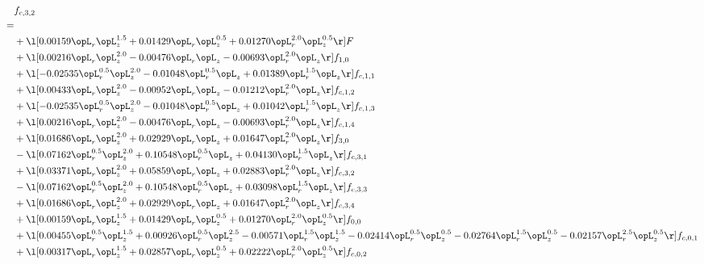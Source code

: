 \begin{alignat}{2} 
\label{eq:f_32_1} 
& f_{c,3,2} \nonumber \\ 
 = \\ 
& + \l[  0.00159 \opL_r \opL_z^{1.5} +  0.01429 \opL_r \opL_z^{0.5} +  0.01270 \opL_r^{2.0} \opL_z^{0.5}  \r] F \nonumber \\ 
& + \l[  0.00216 \opL_r \opL_z^{2.0}   -0.00476 \opL_r \opL_z   -0.00693 \opL_r^{2.0} \opL_z  \r] f_{1,0} \nonumber \\ 
& + \l[  -0.02535 \opL_r^{0.5} \opL_z^{2.0}   -0.01048 \opL_r^{0.5} \opL_z +  0.01389 \opL_r^{1.5} \opL_z  \r] f_{c,1,1} \nonumber \\ 
& + \l[  0.00433 \opL_r \opL_z^{2.0}   -0.00952 \opL_r \opL_z   -0.01212 \opL_r^{2.0} \opL_z  \r] f_{c,1,2} \nonumber \\ 
& + \l[  -0.02535 \opL_r^{0.5} \opL_z^{2.0}   -0.01048 \opL_r^{0.5} \opL_z +  0.01042 \opL_r^{1.5} \opL_z  \r] f_{c,1,3} \nonumber \\ 
& + \l[  0.00216 \opL_r \opL_z^{2.0}   -0.00476 \opL_r \opL_z   -0.00693 \opL_r^{2.0} \opL_z  \r] f_{c,1,4} \nonumber \\ 
& + \l[  0.01686 \opL_r \opL_z^{2.0} +  0.02929 \opL_r \opL_z +  0.01647 \opL_r^{2.0} \opL_z  \r] f_{3,0} \nonumber \\ 
& - \l[  0.07162 \opL_r^{0.5} \opL_z^{2.0} +  0.10548 \opL_r^{0.5} \opL_z +  0.04130 \opL_r^{1.5} \opL_z  \r] f_{c,3,1} \nonumber \\ 
& + \l[  0.03371 \opL_r \opL_z^{2.0} +  0.05859 \opL_r \opL_z +  0.02883 \opL_r^{2.0} \opL_z  \r] f_{c,3,2} \nonumber \\ 
& - \l[  0.07162 \opL_r^{0.5} \opL_z^{2.0} +  0.10548 \opL_r^{0.5} \opL_z +  0.03098 \opL_r^{1.5} \opL_z  \r] f_{c,3,3} \nonumber \\ 
& + \l[  0.01686 \opL_r \opL_z^{2.0} +  0.02929 \opL_r \opL_z +  0.01647 \opL_r^{2.0} \opL_z  \r] f_{c,3,4} \nonumber \\ 
& + \l[  0.00159 \opL_r \opL_z^{1.5} +  0.01429 \opL_r \opL_z^{0.5} +  0.01270 \opL_r^{2.0} \opL_z^{0.5}  \r] f_{0,0} \nonumber \\ 
& + \l[  0.00455 \opL_r^{0.5} \opL_z^{1.5} +  0.00926 \opL_r^{0.5} \opL_z^{2.5}   -0.00571 \opL_r^{1.5} \opL_z^{1.5}   -0.02414 \opL_r^{0.5} \opL_z^{0.5}   -0.02764 \opL_r^{1.5} \opL_z^{0.5}   -0.02157 \opL_r^{2.5} \opL_z^{0.5}  \r] f_{c,0,1} \nonumber \\ 
& + \l[  0.00317 \opL_r \opL_z^{1.5} +  0.02857 \opL_r \opL_z^{0.5} +  0.02222 \opL_r^{2.0} \opL_z^{0.5}  \r] f_{c,0,2} \nonumber \\ 

\end{alignat}
